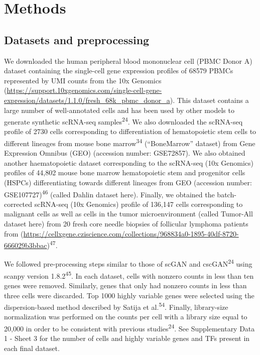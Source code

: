 \section*{Methods}
\label{sec:groundgan:methods}

\subsection*{Datasets and preprocessing}

We downloaded the human peripheral blood mononuclear cell (PBMC Donor A) dataset containing the single-cell gene expression profiles of 68579 PBMCs represented by UMI counts from the 10x Genomics (\url{https://support.10xgenomics.com/single-cell-gene-expression/datasets/1.1.0/fresh_68k_pbmc_donor_a}). This dataset contains a large number of well-annotated cells and has been used by other models to generate synthetic scRNA-seq samples\textsuperscript{24}. We also downloaded the scRNA-seq profile of 2730 cells corresponding to differentiation of hematopoietic stem cells to different lineages from mouse bone marrow\textsuperscript{34} (“BoneMarrow” dataset) from Gene Expression Omnibus (GEO) (accession number: GSE72857). We also obtained another haematopoietic dataset corresponding to the scRNA-seq (10x Genomics) profiles of 44,802 mouse bone marrow hematopoietic stem and progenitor cells (HSPCs) differentiating towards different lineages from GEO (accession number: GSE107727)\textsuperscript{46} (called Dahlin dataset here). Finally, we obtained the batch-corrected scRNA-seq (10x Genomics) profile of 136,147 cells corresponding to malignant cells as well as cells in the tumor microenvironment (called Tumor-All dataset here) from 20 fresh core needle biopsies of follicular lymphoma patients from (\url{https://cellxgene.cziscience.com/collections/968834a0-1895-40df-8720-666029b3bbac})\textsuperscript{47}.

We followed pre-processing steps similar to those of scGAN and cscGAN\textsuperscript{24} using scanpy version 1.8.2\textsuperscript{45}. In each dataset, cells with nonzero counts in less than ten genes were removed. Similarly, genes that only had nonzero counts in less than three cells were discarded. Top 1000 highly variable genes were selected using the dispersion-based method described by Satija et al.\textsuperscript{54}. Finally, library-size normalization was performed on the counts per cell with a library size equal to 20,000 in order to be consistent with previous studies\textsuperscript{24}. See Supplementary Data 1 - Sheet 3 for the number of cells and highly variable genes and TFs present in each final dataset.

